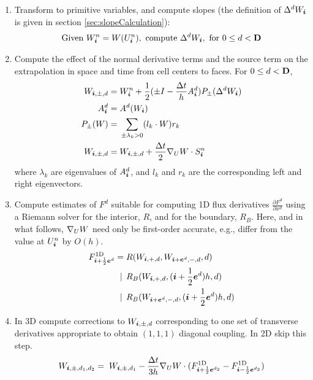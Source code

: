 \begin{enumerate}
\item Transform to primitive variables, and compute slopes (the definition of
$\Delta^d W_{\boldsymbol{i}}$ is given in section \ref{sec:slopeCalculation}):
\begin{gather*}
\text{Given} ~ W^n_{\boldsymbol{i}} = W(U^n_{\boldsymbol{i}}),
~ \text{compute} ~ \Delta^d W_{\boldsymbol{i}},
~ \text{for} ~ 0 \le d < {\mathbf{D}}
\end{gather*}

\item Compute the effect of the normal derivative terms and the source
term on the extrapolation in space and time from cell centers to
faces.  For $0 \le d < {\mathbf{D}}$,
\begin{alignat}{1}
W_{{\boldsymbol{i}}, \pm, d}
= & \; W^n_{\boldsymbol{i}} +
       \frac{1}{2} (\pm I - \frac{\Delta t}{h} A^d_{\boldsymbol{i}}) P_\pm (\Delta^d W_{\boldsymbol{i}}) 
       \label{eqn:normalPred} \\
A^d_{\boldsymbol{i}}
= & \; A^d(W_{{\boldsymbol{i}}}) \notag \\
P_\pm(W)
= & \; \sum_{\pm \lambda_k > 0} (l_k \cdot W) r_k  \notag \\
W_{{\boldsymbol{i}}, \pm, d}
= & \; W_{{\boldsymbol{i}}, \pm, d} + \frac{\Delta t}{2}
       \nabla_U W \cdot S^n_{\boldsymbol{i}} \label{eqn:sourcePred}
\end{alignat}
where $\lambda_k$ are eigenvalues of $A^d_{\boldsymbol{i}}$, and 
$l_k$ and $r_k$ are the corresponding left and right eigenvectors.

\item Compute estimates of $F^d$ suitable for computing 1D flux
derivatives $\frac{\partial F^d}{\partial x^d}$ using a Riemann solver
for the interior, $R$, and for the boundary, $R_B$. 
Here, and in what follows, $\nabla_U W$ need only be first-order
accurate, e.g., differ from the value at $U^n_{\boldsymbol{i}}$ by $O(h)$.
\begin{equation} \label{eqn:riemann1}
\begin{split}
F^{\text{1D}}_{{\boldsymbol{i}} + \frac{1}{2} {\boldsymbol{e}}^d} =
    \; & R  (W_{{\boldsymbol{i}}, +, d}, W_{{\boldsymbol{i}} + {\boldsymbol{e}}^d, -, d},           d) \\
| \,\; & R_B(W_{{\boldsymbol{i}},            +, d}, ({\boldsymbol{i}} + \frac{1}{2} {\boldsymbol{e}}^d)h, d) \\
| \,\; & R_B(W_{{\boldsymbol{i}} + {\boldsymbol{e}}^d, -, d}, ({\boldsymbol{i}} + \frac{1}{2} {\boldsymbol{e}}^d)h, d)
\end{split}
\end{equation}

\item In 3D compute corrections to $W_{{\boldsymbol{i}}, \pm, d}$ corresponding to one
set of transverse derivatives appropriate to obtain $(1, 1, 1)$
diagonal coupling.  In 2D skip this step.
\begin{equation} \label{eqn:updateprim1}
W_{{\boldsymbol{i}}, \pm, d_1, d_2}
=  \; W_{{\boldsymbol{i}}, \pm, d_1}
    - \frac{\Delta t}{3h} \nabla_U W \cdot
      (F^{\text{1D}}_{{\boldsymbol{i}} + \frac{1}{2} {\boldsymbol{e}}^{d_2}}
     - F^{\text{1D}}_{{\boldsymbol{i}} - \frac{1}{2} {\boldsymbol{e}}^{d_2}})
\end{equation}


\end{enumerate}

